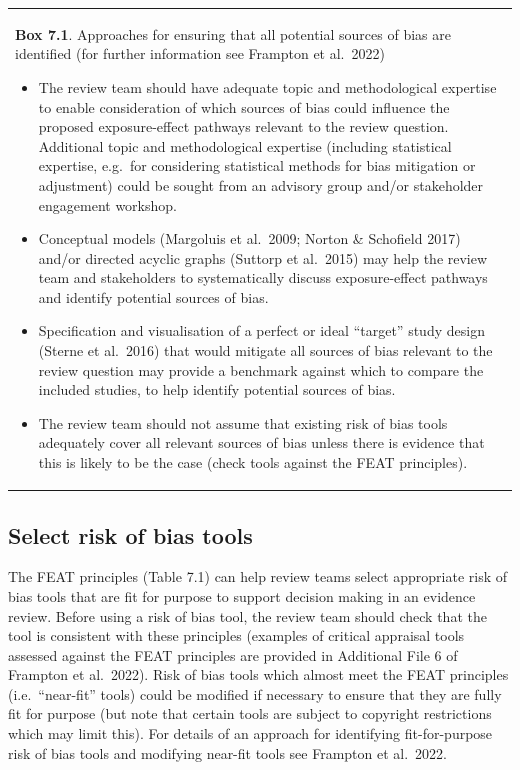 \documentclass[
  letterpaper,
  DIV=11,
  numbers=noendperiod]{scrreprt}
\newcounter{none} %
\begin{document}
{\def\LTcaptype{none} %
\begin{longtable}[]{@{}
  >{\raggedright\arraybackslash}p{}@{}}
\toprule\noalign{}
\endhead
\bottomrule\noalign{}
\endlastfoot
\begin{minipage}[t]{\linewidth}\raggedright
\textbf{Box 7.1}. Approaches for ensuring that all potential sources of
bias are identified (for further information see Frampton et al.~2022)

\begin{itemize}
\item
  The review team should have adequate topic and methodological
  expertise to enable consideration of which sources of bias could
  influence the proposed exposure-effect pathways relevant to the review
  question. Additional topic and methodological expertise (including
  statistical expertise, e.g.~for considering statistical methods for
  bias mitigation or adjustment) could be sought from an advisory group
  and/or stakeholder engagement workshop.
\item
  Conceptual models (Margoluis et al.~2009; Norton \& Schofield 2017)
  and/or directed acyclic graphs (Suttorp et al.~2015) may help the
  review team and stakeholders to systematically discuss exposure-effect
  pathways and identify potential sources of bias.
\item
  Specification and visualisation of a perfect or ideal ``target'' study
  design (Sterne et al.~2016) that would mitigate all sources of bias
  relevant to the review question may provide a benchmark against which
  to compare the included studies, to help identify potential sources of
  bias.
\item
  The review team should not assume that existing risk of bias tools
  adequately cover all relevant sources of bias unless there is evidence
  that this is likely to be the case (check tools against the FEAT
  principles).
\end{itemize}
\end{minipage} \\
\end{longtable}
}

\subsection{Select risk of bias tools}\label{select-risk-of-bias-tools}

The FEAT principles (Table 7.1) can help review teams select appropriate
risk of bias tools that are fit for purpose to support decision making
in an evidence review. Before using a risk of bias tool, the review team
should check that the tool is consistent with these principles (examples
of critical appraisal tools assessed against the FEAT principles are
provided in Additional File 6 of Frampton et al.~2022). Risk of bias
tools which almost meet the FEAT principles (i.e.~``near-fit'' tools)
could be modified if necessary to ensure that they are fully fit for
purpose (but note that certain tools are subject to copyright
restrictions which may limit this). For details of an approach for
identifying fit-for-purpose risk of bias tools and modifying near-fit
tools see Frampton et al.~2022.
\end{document}
